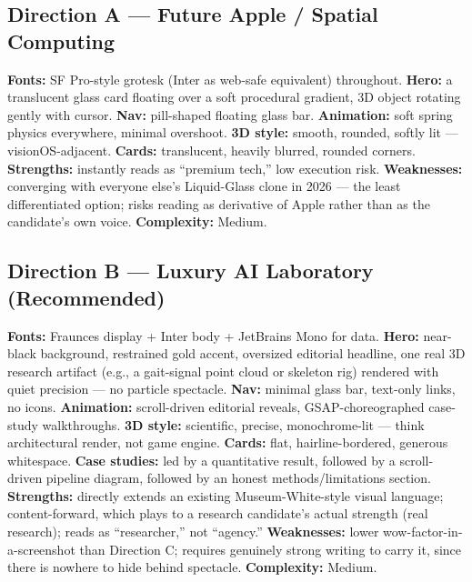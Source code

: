 \documentclass[conference]{IEEEtran}
\begin{document}
\subsection{Direction A --- Future Apple / Spatial Computing}
\noindent
{}
\par
\textbf{Fonts:} SF Pro-style grotesk (Inter as web-safe equivalent) throughout. \textbf{Hero:} a translucent glass card floating over a soft procedural gradient, 3D object rotating gently with cursor. \textbf{Nav:} pill-shaped floating glass bar. \textbf{Animation:} soft spring physics everywhere, minimal overshoot. \textbf{3D style:} smooth, rounded, softly lit --- visionOS-adjacent. \textbf{Cards:} translucent, heavily blurred, rounded corners. \textbf{Strengths:} instantly reads as ``premium tech,'' low execution risk. \textbf{Weaknesses:} converging with everyone else's Liquid-Glass clone in 2026 --- the least differentiated option; risks reading as derivative of Apple rather than as the candidate's own voice. \textbf{Complexity:} Medium.

\subsection{Direction B --- Luxury AI Laboratory (Recommended)}
\noindent
{}
\par
\textbf{Fonts:} Fraunces display + Inter body + JetBrains Mono for data. \textbf{Hero:} near-black background, restrained gold accent, oversized editorial headline, one real 3D research artifact (e.g., a gait-signal point cloud or skeleton rig) rendered with quiet precision --- no particle spectacle. \textbf{Nav:} minimal glass bar, text-only links, no icons. \textbf{Animation:} scroll-driven editorial reveals, GSAP-choreographed case-study walkthroughs. \textbf{3D style:} scientific, precise, monochrome-lit --- think architectural render, not game engine. \textbf{Cards:} flat, hairline-bordered, generous whitespace. \textbf{Case studies:} led by a quantitative result, followed by a scroll-driven pipeline diagram, followed by an honest methods/limitations section. \textbf{Strengths:} directly extends an existing Museum-White-style visual language; content-forward, which plays to a research candidate's actual strength (real research); reads as ``researcher,'' not ``agency.'' \textbf{Weaknesses:} lower wow-factor-in-a-screenshot than Direction C; requires genuinely strong writing to carry it, since there is nowhere to hide behind spectacle. \textbf{Complexity:} Medium.
\end{document}
